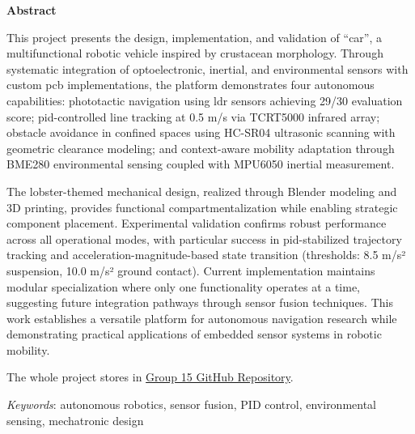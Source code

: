 
\begin{center}
\LARGE\textbf {Abstract}
\end{center}
\vspace{5pt}

This project presents the design, implementation, and validation of ``\gls{car}'', a multifunctional robotic vehicle inspired by crustacean morphology. Through systematic integration of optoelectronic, inertial, and environmental sensors with custom \gls{pcb} implementations, the platform demonstrates four autonomous capabilities: phototactic navigation using \gls{ldr} sensors achieving 29/30 evaluation score; \gls{pid}-controlled line tracking at 0.5 m/s via TCRT5000 infrared array; obstacle avoidance in confined spaces using HC-SR04 ultrasonic scanning with geometric clearance modeling; and context-aware mobility adaptation through BME280 environmental sensing coupled with MPU6050 inertial measurement. 

The lobster-themed mechanical design, realized through Blender modeling and 3D printing, provides functional compartmentalization while enabling strategic component placement. Experimental validation confirms robust performance across all operational modes, with particular success in \gls{pid}-stabilized trajectory tracking and acceleration-magnitude-based state transition (thresholds: 8.5 m/s² suspension, 10.0 m/s² ground contact). Current implementation maintains modular specialization where only one functionality operates at a time, suggesting future integration pathways through sensor fusion techniques. This work establishes a versatile platform for autonomous navigation research while demonstrating practical applications of embedded sensor systems in robotic mobility.

The whole project stores in \href{https://github.com/RamessesN/Robotics-Group-15}{Group 15 GitHub Repository}.

\vspace{10pt}
\textit{Keywords}: autonomous robotics, sensor fusion, PID control, environmental sensing, mechatronic design